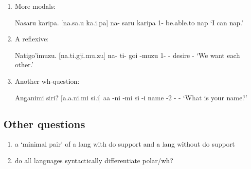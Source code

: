 \begin{enumerate}
			\item More modals:
				\begin{example}
				\label{modals_2}  %
					Nasaru karipa. [na.\stress sa.\R u ka.\stress\R i.pa]
					\gll na- saru karipa
					1- be.able.to nap 
					\glt `I can nap.'
					\glend
				\end{example}

			\item A reflexive:
				\begin{example}
				\label{reflexive}
					Natigo'imuzu. [na.\stress ti.gji.mu.zu]
					\gll na- ti- go\glot i -muzu
					1- - desire -\D{refl}
					\glt `We want each other.'
					\glend
				\end{example}

			\item Another wh-question:
				\begin{example}
				\label{wh_2}
					Anganimi siri? [\glot a.\stress\N a.ni.mi \stress si.\R i]
					\gll \glot a\N a -ni -mi si -\R i
					name -2 -{\poss} {\cop} -\interr
					\glt `What is your name?'
					\glend
				\end{example}
		\end{enumerate}

	\subsection{Other questions}
		\begin{enumerate}
			\item a `minimal pair' of a lang with do support and a lang without do support
			\item do all languages syntactically differentiate polar/wh?
		\end{enumerate}





